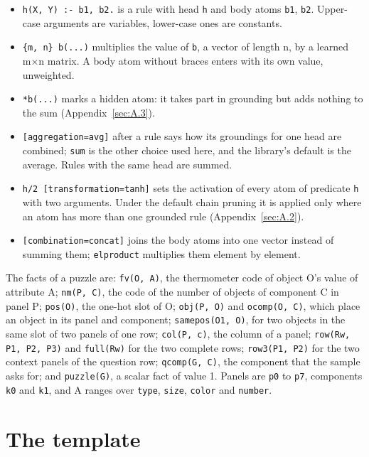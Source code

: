 \begin{itemize}
\item \texttt{h(X, Y) :- b1, b2.} is a rule with head \texttt{h} and body atoms \texttt{b1}, \texttt{b2}. Upper-case arguments are variables, lower-case ones are constants.
\item \texttt{\{m, n\} b(...)} multiplies the value of \texttt{b}, a vector of length n, by a learned m×n matrix. A body atom without braces enters with its own value, unweighted.
\item \texttt{*b(...)} marks a hidden atom: it takes part in grounding but adds nothing to the sum (Appendix~\ref{sec:A.3}).
\item \texttt{[aggregation=avg]} after a rule says how its groundings for one head are combined; \texttt{sum} is the other choice used here, and the library's default is the average. Rules with the same head are summed.
\item \texttt{h/2 [transformation=tanh]} sets the activation of every atom of predicate \texttt{h} with two arguments. Under the default chain pruning it is applied only where an atom has more than one grounded rule (Appendix~\ref{sec:A.2}).
\item \texttt{[combination=concat]} joins the body atoms into one vector instead of summing them; \texttt{elproduct} multiplies them element by element.
\end{itemize}

The facts of a puzzle are: \texttt{fv(O, A)}, the thermometer code of object O's value of attribute A; \texttt{nm(P, C)}, the code of the number of objects of component C in panel P; \texttt{pos(O)}, the one-hot slot of O; \texttt{obj(P, O)} and \texttt{ocomp(O, C)}, which place an object in its panel and component; \texttt{samepos(O1, O)}, for two objects in the same slot of two panels of one row; \texttt{col(P, c)}, the column of a panel; \texttt{row(Rw, P1, P2, P3)} and \texttt{full(Rw)} for the two complete rows; \texttt{row3(P1, P2)} for the two context panels of the question row; \texttt{qcomp(G, C)}, the component that the sample asks for; and \texttt{puzzle(G)}, a scalar fact of value 1. Panels are \texttt{p0} to \texttt{p7}, components \texttt{k0} and \texttt{k1}, and A ranges over \texttt{type}, \texttt{size}, \texttt{color} and \texttt{number}.

\section{The template}\label{sec:C.2}

